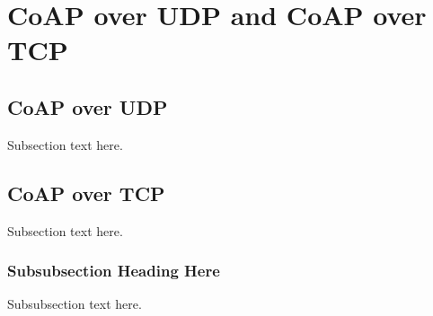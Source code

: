 \section{CoAP over UDP and CoAP over TCP}


\subsection{CoAP over UDP}
Subsection text here.

\subsection{CoAP over TCP}
Subsection text here.








\subsubsection{Subsubsection Heading Here}
Subsubsection text here.
